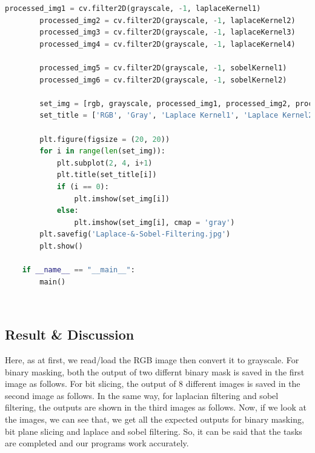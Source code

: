 \documentclass{article}
\begin{document}
{\begin{lstlisting}[language=Python, caption=Code for laplacian filtering and sobel filtering on a grayscale image]
        processed_img1 = cv.filter2D(grayscale, -1, laplaceKernel1)
        processed_img2 = cv.filter2D(grayscale, -1, laplaceKernel2)
        processed_img3 = cv.filter2D(grayscale, -1, laplaceKernel3)
        processed_img4 = cv.filter2D(grayscale, -1, laplaceKernel4)
    
        processed_img5 = cv.filter2D(grayscale, -1, sobelKernel1)
        processed_img6 = cv.filter2D(grayscale, -1, sobelKernel2)
    
        set_img = [rgb, grayscale, processed_img1, processed_img2, processed_img3, processed_img4, processed_img5, processed_img6]
        set_title = ['RGB', 'Gray', 'Laplace Kernel1', 'Laplace Kernel2', 'Laplace Kernel3', 'Laplace Kernel4', 'Sobel Kernel1', 'Sobel Kernel2']
    
        plt.figure(figsize = (20, 20))
        for i in range(len(set_img)):
            plt.subplot(2, 4, i+1)
            plt.title(set_title[i])
            if (i == 0):
                plt.imshow(set_img[i])
            else:
                plt.imshow(set_img[i], cmap = 'gray')
        plt.savefig('Laplace-&-Sobel-Filtering.jpg')
        plt.show()
    
    if __name__ == "__main__":
        main()

    \end{lstlisting}
    \\
    
    \subsection{Result & Discussion}{
        Here, as at first, we read/load the RGB image then convert it to grayscale. For binary masking, both the output of two differnt binary mask is saved in the first image as follows. For bit slicing, the output of 8 different images is saved in the second image as follows. In the same way, for laplacian filtering and sobel filtering, the outputs are shown in the third images as follows. Now, if we look at the images, we can see that, we get all the expected outputs for binary masking, bit plane slicing and laplace and sobel filtering. So, it can be said that the tasks are completed and our programs work accurately.
        
}}
\end{document}

